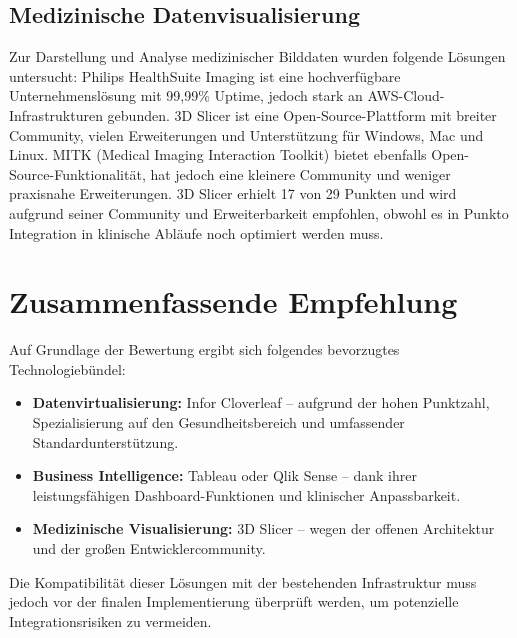 \subsection{Medizinische Datenvisualisierung}
Zur Darstellung und Analyse medizinischer Bilddaten wurden folgende Lösungen untersucht:
Philips HealthSuite Imaging ist eine hochverfügbare Unternehmenslösung mit 99,99\% Uptime, jedoch stark an AWS-Cloud-Infrastrukturen gebunden.
3D Slicer ist eine Open-Source-Plattform mit breiter Community, vielen Erweiterungen und Unterstützung für Windows, Mac und Linux.
MITK (Medical Imaging Interaction Toolkit) bietet ebenfalls Open-Source-Funktionalität, hat jedoch eine kleinere Community und weniger praxisnahe Erweiterungen.
3D Slicer erhielt 17 von 29 Punkten und wird aufgrund seiner Community und Erweiterbarkeit empfohlen, obwohl es in Punkto Integration in klinische Abläufe noch optimiert werden muss.

\section{Zusammenfassende Empfehlung}
Auf Grundlage der Bewertung ergibt sich folgendes bevorzugtes Technologiebündel:
\begin{itemize}
	\item \textbf{Datenvirtualisierung:} Infor Cloverleaf – aufgrund der hohen Punktzahl, Spezialisierung auf den Gesundheitsbereich und umfassender Standardunterstützung.
	\item \textbf{Business Intelligence:} Tableau oder Qlik Sense – dank ihrer leistungsfähigen Dashboard-Funktionen und klinischer Anpassbarkeit.
	\item \textbf{Medizinische Visualisierung:} 3D Slicer – wegen der offenen Architektur und der großen Entwicklercommunity.

\end{itemize}Die Kompatibilität dieser Lösungen mit der bestehenden Infrastruktur muss jedoch vor der finalen Implementierung überprüft werden, um potenzielle Integrationsrisiken zu vermeiden.
